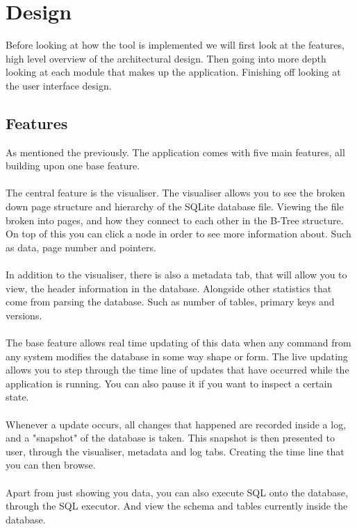 \section{Design}
\label{sec:design}

Before looking at how the tool is implemented we will first look at the features, high level overview of the architectural design. Then going into more depth looking at each module that makes up the application. Finishing off looking at the user interface design.

\subsection{Features}
\label{subsec:Features}
As mentioned the previously. The application comes with five main features, all building upon one base feature.
\\\\
The central feature is the visualiser. The visualiser allows you to see the broken down page structure and hierarchy of the SQLite database file. Viewing the file broken into pages, and how they connect to each other in the B-Tree structure. On top of this you can click a node in order to see more information about. Such as data, page number and pointers.
\\\\
In addition to the visualiser, there is also a metadata tab, that will allow you to view, the header information in the database. Alongside other statistics that come from parsing the database. Such as number of tables, primary keys and versions.
\\\\
The base feature allows real time updating of this data when any command from any system modifies the database in some way shape or form. The live updating allows you to step through the time line of updates that have occurred while the application is running. You can also pause it if you want to inspect a certain state. 
\\\\
Whenever a update occurs, all changes that happened are recorded inside a log, and a "snapshot" of the database is taken. This snapshot is then presented to user, through the visualiser, metadata and log tabs. Creating the time line that you can then browse. 
\\\\
Apart from just showing you data, you can also execute SQL onto the database, through the SQL executor. And view the schema and tables currently inside the database. 

